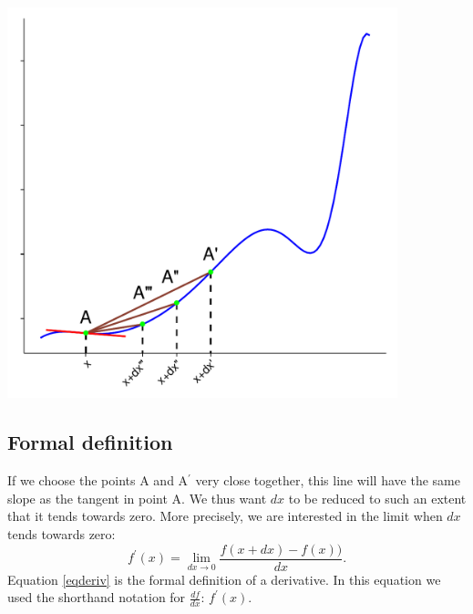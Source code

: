 \documentclass[a4paper]{report}
\begin{document}
\begin{center}
\includegraphics[width=0.85\textwidth]{der_graph4.pdf}
\end{center}
\subsection{Formal definition}
If we choose the points A and A$^\prime$ very close together, this line will have the same slope as the tangent in point A. We thus want $dx$ to be reduced to such an extent that it tends towards zero. More precisely, we are interested in the limit when $dx$ tends towards zero:
\begin{equation}
f^\prime(x)=\lim\limits_{dx \to 0}\frac{f(x+dx)-f(x))}{dx}.
\label{eqderiv}
\end{equation}
Equation \ref{eqderiv} is the formal definition of a derivative. In this equation we used the shorthand notation for $\frac{df}{dx}$: $f^\prime (x)$.
\end{document}
